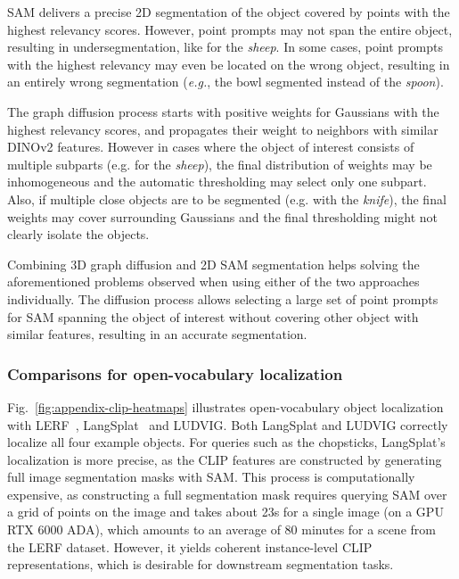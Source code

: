  SAM delivers a precise 2D segmentation of the object covered by points with the highest relevancy scores. However, point prompts may not span the entire object, resulting in undersegmentation, like for the \emph{sheep}. In some cases, point prompts with the highest relevancy may even be located on the wrong object, resulting in an entirely wrong segmentation (\emph{e.g.}, the bowl segmented instead of the \emph{spoon}).

 The graph diffusion process starts with positive weights for Gaussians with the highest relevancy scores, and propagates their weight to neighbors with similar DINOv2 features. However in cases where the object of interest consists of multiple subparts (e.g. for the \emph{sheep}), the final distribution of weights may be inhomogeneous and the automatic thresholding may select only one subpart. Also, if multiple close objects are to be segmented (e.g. with the \emph{knife}), the final weights may cover surrounding Gaussians and the final thresholding might not clearly isolate the objects.

Combining 3D graph diffusion and 2D SAM segmentation helps solving the aforementioned problems observed when using either of the two approaches individually. The diffusion process allows selecting a large set of point prompts for SAM spanning the object of interest without covering other object with similar features, resulting in an accurate segmentation.

\subsubsection{Comparisons for open-vocabulary localization} Fig.~\ref{fig:appendix-clip-heatmaps} illustrates open-vocabulary object localization with LERF~\citep{kerr2023lerf}, LangSplat~\citep{qin2023langsplat} and LUDVIG. Both LangSplat and LUDVIG correctly localize all four example objects. For queries such as the chopsticks, LangSplat's localization is more precise, as the CLIP features are constructed by generating full image segmentation masks with SAM. This process is computationally expensive, as constructing a full segmentation mask requires querying SAM over a grid of points on the image and takes about 23s for a single image (on a GPU RTX 6000 ADA), which amounts to an average of 80 minutes for a scene from the LERF dataset. However, it yields coherent instance-level CLIP representations, which is desirable for downstream segmentation tasks.

